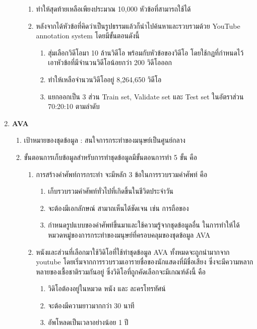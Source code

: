 \begin{enumerate}
\begin{enumerate}
\begin{enumerate}
			\item ทำให้สุดท้ายเหลือเพียงประมาณ 10,000 หัวข้อที่สามารถใช้ได้
			\item หลังจากได้หัวข้อที่คิดว่าเป็นรูปธรรมแล้วก็นำไปค้นหาและรวบรวมด้วย YouTube annotation system โดยมีขั้นตอนดังนี้										\begin{enumerate}
				\setlength\itemsep{-0.25em}
				\item สุ่มเลือกวิดีโอมา 10 ล้านวิดีโอ พร้อมกับหัวข้อของวิดีโอ โดยใช้กฏที่กำหนดไว้ เอาหัวข้อที่มีจำนวนวิดีโอน้อยกว่า 200 วิดีโอออก
				\item ทำให้เหลือจำนวนวิดีโออยู่ 8,264,650 วิดีโอ
				\item แยกออกเป็น 3 ส่วน Train set, Validate set และ Test set ในอัตราส่วน 70:20:10 ตามลำดับ
			\end{enumerate}
		\end{enumerate}
	\end{enumerate}
	\item \textbf{AVA}
	\begin{enumerate}
		\setlength\itemsep{-0.25em}
		\item เป้าหมายของชุดข้อมูล : สนใจการกระทำของมนุษย์เป็นศูนย์กลาง
		\item ขั้นตอนการเก็บข้อมูลสำหรับการทำชุดข้อมูลมีขั้นตอนการทำ 5 ขั้น คือ
	\begin{enumerate}
%
		\item การสร้างคำศัพท์การกระทำ จะมีหลัก 3 ข้อในการรวบรวมคำศัพท์ คือ
		\begin{enumerate}
			\item เก็บรวบรวมคำศัพท์ทั่วไปที่เกิดขึ้นในชีวิตประจำวัน
			\item จะต้องมีเอกลักษณ์ สามาถเห็นได้ชัดเจน เช่น การถือของ
			\item กำหนดรูปแบบของคำศัพท์ขึ้นมาและใช้ความรู้จากชุดข้อมูลอื่น ในการทำให้ได้หมวดหมู่ของการกระทำของมนุษย์ที่ครอบคลุมของชุดข้อมูล AVA
		\end{enumerate}
		\setlength\itemsep{-0.25em}
%
		\item  หนังและส่วนที่เลือกมาใช้วิดิโอที่ใช้ทำชุดข้อมูล AVA ทั้งหมดจะถูกนำมากจาก youtube โดยเริ่มจากการรวบรวมเอารายชื่อของนักแสดงที่มีชื่อเสียง ซึ่งจะมีความหลากหลายของเชื้อชาติรวมกันอยู่ ซึ่งวิดิโอที่ถูกคัดเลือกจะมีเกณฑ์ดังนี้ คือ
			\begin{enumerate}
				\item วิดิโอต้องอยู่ในหมวด หนัง และ ละครโทรทัศน์
				\item จะต้องมีความยาวมากกว่า 30 นาที
				\item อัพโหลดเป็นเวลาอย่างน้อย 1 ปี

\end{enumerate}
\end{enumerate}
\end{enumerate}
\end{enumerate}
